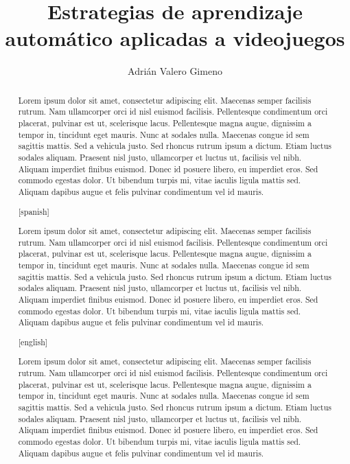 \documentclass[11pt,spanish,listoffigures,listoftables]{tfgetsinf}
\title{Estrategias de aprendizaje automático aplicadas a videojuegos}
\author{Adrián Valero Gimeno}
\begin{document}

\begin{abstract}


Lorem ipsum dolor sit amet, consectetur adipiscing elit. Maecenas semper facilisis rutrum. Nam ullamcorper orci id nisl euismod facilisis. Pellentesque condimentum orci placerat, pulvinar est ut, scelerisque lacus. Pellentesque magna augue, dignissim a tempor in, tincidunt eget mauris. Nunc at sodales nulla. Maecenas congue id sem sagittis mattis. Sed a vehicula justo. Sed rhoncus rutrum ipsum a dictum. Etiam luctus sodales aliquam. Praesent nisl justo, ullamcorper et luctus ut, facilisis vel nibh. Aliquam imperdiet finibus euismod. Donec id posuere libero, eu imperdiet eros. Sed commodo egestas dolor. Ut bibendum turpis mi, vitae iaculis ligula mattis sed. Aliquam dapibus augue et felis pulvinar condimentum vel id mauris. 
\end{abstract}
\begin{abstract}[spanish]


Lorem ipsum dolor sit amet, consectetur adipiscing elit. Maecenas semper facilisis rutrum. Nam ullamcorper orci id nisl euismod facilisis. Pellentesque condimentum orci placerat, pulvinar est ut, scelerisque lacus. Pellentesque magna augue, dignissim a tempor in, tincidunt eget mauris. Nunc at sodales nulla. Maecenas congue id sem sagittis mattis. Sed a vehicula justo. Sed rhoncus rutrum ipsum a dictum. Etiam luctus sodales aliquam. Praesent nisl justo, ullamcorper et luctus ut, facilisis vel nibh. Aliquam imperdiet finibus euismod. Donec id posuere libero, eu imperdiet eros. Sed commodo egestas dolor. Ut bibendum turpis mi, vitae iaculis ligula mattis sed. Aliquam dapibus augue et felis pulvinar condimentum vel id mauris. 
\end{abstract}
\begin{abstract}[english]


Lorem ipsum dolor sit amet, consectetur adipiscing elit. Maecenas semper facilisis rutrum. Nam ullamcorper orci id nisl euismod facilisis. Pellentesque condimentum orci placerat, pulvinar est ut, scelerisque lacus. Pellentesque magna augue, dignissim a tempor in, tincidunt eget mauris. Nunc at sodales nulla. Maecenas congue id sem sagittis mattis. Sed a vehicula justo. Sed rhoncus rutrum ipsum a dictum. Etiam luctus sodales aliquam. Praesent nisl justo, ullamcorper et luctus ut, facilisis vel nibh. Aliquam imperdiet finibus euismod. Donec id posuere libero, eu imperdiet eros. Sed commodo egestas dolor. Ut bibendum turpis mi, vitae iaculis ligula mattis sed. Aliquam dapibus augue et felis pulvinar condimentum vel id mauris. 

\end{abstract}
\end{document}
